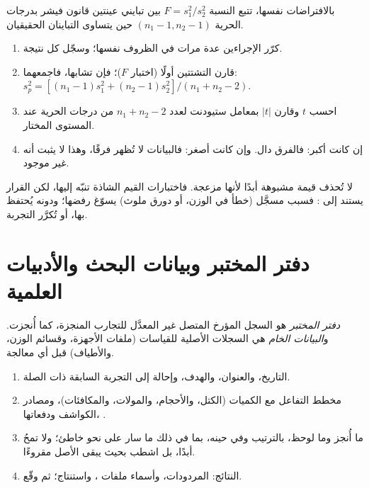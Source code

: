 \begin{proposition}[اختبار $F$]\label{prop:b3:lab-techniques-3:f-test}
بالافتراضات نفسها، تتبع النسبة $F = s_1^2/s_2^2$ بين تبايني عينتين
قانون فيشر بدرجات الحرية $(n_1 - 1, n_2 - 1)$ حين يتساوى التباينان الحقيقيان.
\admitted
\end{proposition}

\begin{method}\label{met:b3:lab-techniques-3:compare-means}
\begin{enumerate}
  \item كرّر الإجراءين عدة مرات في الظروف نفسها؛ وسجّل
        كل نتيجة.
  \item قارن التشتتين أولًا (اختبار $F$)؛ فإن تشابها، فاجمعهما:
        $s_p^2 = [(n_1 - 1)s_1^2 + (n_2 - 1)s_2^2]/(n_1 + n_2 - 2)$.
  \item احسب $t$ وقارن $|t|$ بمعامل ستيودنت لعدد $n_1 + n_2 - 2$ من درجات
        الحرية عند المستوى المختار.
  \item إن كانت أكبر: فالفرق دال. وإن كانت أصغر: فالبيانات لا تُظهر فرقًا،
        وهذا لا يثبت أنه غير موجود.
\end{enumerate}
\end{method}

لا تُحذف قيمة مشبوهة أبدًا لأنها مزعجة. فاختبارات القيم الشاذة
تنبّه إليها، لكن القرار يستند إلى : فسبب مسجَّل (خطأ في
الوزن، أو دورق ملوث) يسوّغ رفضها؛ ودونه يُحتفظ بها،
أو تُكرَّر التجربة.

\section{دفتر المختبر وبيانات البحث والأدبيات العلمية}

\begin{definition}\label{def:b3:lab-techniques-3:notebook}
\emph{دفتر المختبر} هو السجل المؤرخ
المتصل غير المعدَّل للتجارب المنجزة، كما أُنجزت. و\emph{البيانات
الخام} هي السجلات الأصلية للقياسات (ملفات
الأجهزة، وقسائم الوزن، والأطياف) قبل أي معالجة.
\end{definition}

\begin{method}\label{met:b3:lab-techniques-3:notebook}
\begin{enumerate}
  \item التاريخ، والعنوان، والهدف، وإحالة إلى التجربة السابقة ذات الصلة.
  \item مخطط التفاعل مع الكميات (الكتل، والأحجام، والمولات، والمكافئات)،
        ومصادر الكواشف ودفعاتها، .
  \item ما أُنجز وما لوحظ، بالترتيب وفي حينه، بما في ذلك ما
        سار على نحو خاطئ؛ ولا تمحُ أبدًا، بل اشطب بحيث يبقى الأصل مقروءًا.
  \item النتائج: المردودات، وأسماء ملفات ، واستنتاج؛ ثم وقّع.
\end{enumerate}
\end{method}

